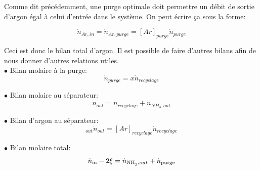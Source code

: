 \documentclass[a4paper, oneside, 12pt]{article}
\begin{document}
Comme dit précédemment, une purge optimale doit permettre un débit de sortie d'argon égal à celui d'entrée dans le système. On peut écrire ça sous la forme:

\begin{equation}
\dot{n}_{Ar,in}=\dot{n}_{Ar,purge}=[Ar]_{purge} \dot{n}_{purge}
\end{equation}

Ceci est donc le bilan total d'argon. Il est possible de faire d'autres bilans afin de nous donner d'autres relations utiles.\\

$\bullet$ Bilan molaire à la purge:
\begin{equation}
\dot{n}_{purge}=x \dot{n}_{recyclage}
\end{equation}

$\bullet$ Bilan molaire au séparateur:
\begin{equation}
\dot{n}_{out}=\dot{n}_{recyclage}+\dot{n}_{NH_3,out}
\end{equation}

$\bullet$ Bilan d'argon au séparateur:
\begin{equation}
[Ar]_{out} \dot{n}_{out}=[Ar]_{recyclage} \dot{n}_{recyclage}
\end{equation}

$\bullet$ Bilan molaire total:
\begin{equation}
	\dot{n}_{\text{in}} - 2\xi = \dot{n}_{\ce{NH_3},out} + \dot{n}_{\text{purge}}
\end{equation}
\end{document}
